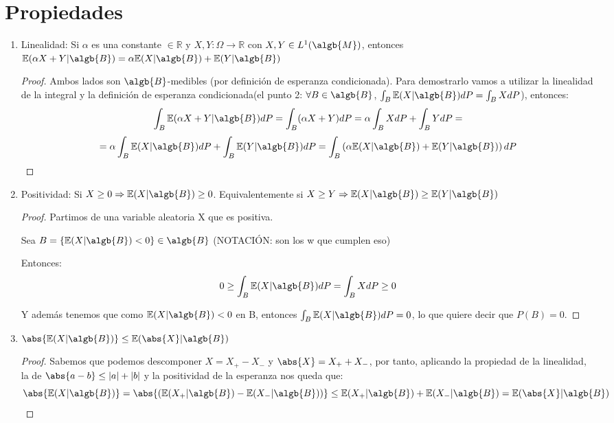 \documentclass{apuntes}
\begin{document}
\section{Propiedades}
\begin{enumerate}
\item Linealidad: Si $\alpha$ es una constante $\in \mathbb{R}$ y $X,Y:\Omega \rightarrow \mathbb{R}$ con $X,Y \in L^1(\algb{M})$, entonces $\mathbb{E}(\alpha X + Y|\algb{B})=\alpha\mathbb{E}(X|\algb{B})+\mathbb{E}(Y|\algb{B})$

\begin{proof}
Ambos lados son $\algb{B}$-medibles (por definición de esperanza condicionada). Para demostrarlo vamos a utilizar la linealidad de la integral y la definición de esperanza condicionada(el punto 2: $\forall B \in \algb{B}$, $\int_{B}\mathbb{E}(X|\algb{B})dP=\int_{B}XdP$), entonces:
\[
\int_B \mathbb{E}(\alpha X + Y|\algb{B})dP= \int_B(\alpha X+Y)dP=\alpha\int_B XdP + \int_B YdP=
\]
\[
=\alpha\int_B \mathbb{E}(X|\algb{B})dP + \int_B \mathbb{E}(Y|\algb{B})dP = \int_B \left(\alpha\mathbb{E}(X|\algb{B}) + \mathbb{E}(Y|\algb{B})\right)dP
\]
\end{proof}
\item Positividad: Si $X \geq 0 \Rightarrow \mathbb{E}(X|\algb{B})\geq 0$. Equivalentemente si  $X \geq Y \Rightarrow \mathbb{E}(X|\algb{B})\geq \mathbb{E}(Y|\algb{B})$
\begin{proof}
Partimos de una variable aleatoria X que es positiva.

Sea $B=\{\mathbb{E}(X|\algb{B}) < 0\} \in \algb{B}$ (NOTACIÓN: son los w que cumplen eso)

Entonces:
\[
0 \geq  \int_B \mathbb{E}(X|\algb{B})dP = \int_B XdP \geq 0
\]

Y además tenemos que como $\mathbb{E}(X|\algb{B})<0$ en B, entonces $\int_B \mathbb{E}(X|\algb{B})dP=0$, lo que quiere decir que $P(B)=0$.
\end{proof}
\item $\abs{\mathbb{E}(X|\algb{B})} \leq \mathbb{E}(\abs{X}|\algb{B})$

\begin{proof}
Sabemos que podemos descomponer $X=X_+ - X_-$ y $\abs{X}=X_++X_-$, por tanto, aplicando la propiedad de la linealidad, la de $\abs{a-b} \leq |a|+|b|$ y la positividad de la esperanza nos queda que:
\[
\abs{\mathbb{E}(X|\algb{B})}=\abs{\left( \mathbb{E}(X_+|\algb{B}) - \mathbb{E}(X_-|\algb{B}) \right)} \leq \mathbb{E}(X_+|\algb{B})+\mathbb{E}(X_-|\algb{B})= \mathbb{E}(\abs{X}|\algb{B})
\]


\end{proof}
\end{enumerate}
\end{document}
